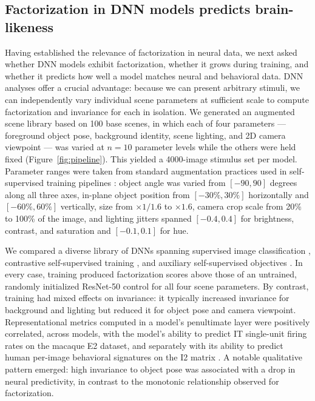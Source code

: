 \documentclass[11pt]{article}
\begin{document}
\subsection{Factorization in DNN models predicts brain-likeness}

Having established the relevance of factorization in neural data, we next
asked whether DNN models exhibit factorization, whether it grows during
training, and whether it predicts how well a model matches neural and
behavioral data. DNN analyses offer a crucial advantage: because we can
present arbitrary stimuli, we can independently vary individual scene
parameters at sufficient scale to compute factorization and invariance for
each in isolation. We generated an augmented scene library based on 100
base scenes, in which each of four parameters --- foreground object pose,
background identity, scene lighting, and 2D camera viewpoint --- was varied
at \(n=10\) parameter levels while the others were held fixed
(Figure~\ref{fig:pipeline}). This yielded a 4000-image stimulus set per
model. Parameter ranges were taken from standard augmentation practices
used in self-supervised training pipelines
\citep{chen2020simple, he2020momentum}: object angle was varied from
\([-90,90]\) degrees along all three axes, in-plane object position from
\([-30\%,30\%]\) horizontally and \([-60\%,60\%]\) vertically, size from
\(\times 1/1.6\) to \(\times 1.6\), camera crop scale from 20\% to 100\% of
the image, and lighting jitters spanned \([-0.4,0.4]\) for brightness,
contrast, and saturation and \([-0.1,0.1]\) for hue.

We compared a diverse library of DNNs spanning supervised image
classification \citep{krizhevsky2012imagenet, he2016deep}, contrastive
self-supervised training \citep{chen2020simple, he2020momentum}, and
auxiliary self-supervised objectives \citep{zhuang2021unsupervised}. In
every case, training produced factorization scores above those of an
untrained, randomly initialized ResNet-50 control for all four scene
parameters. By contrast, training had mixed effects on invariance: it
typically increased invariance for background and lighting but reduced it
for object pose and camera viewpoint. Representational metrics computed in
a model's penultimate layer were positively correlated, across models, with
the model's ability to predict IT single-unit firing rates on the macaque E2
dataset, and separately with its ability to predict human per-image
behavioral signatures on the I2 matrix
\citep{rajalingham2018large}. A notable qualitative pattern emerged: high
invariance to object pose was associated with a drop in neural predictivity,
in contrast to the monotonic relationship observed for factorization.
\end{document}
